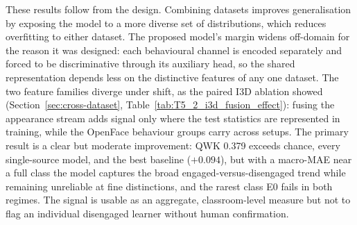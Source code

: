 \documentclass[../main.tex]{subfiles}
\begin{document}
These results follow from the design. Combining datasets improves generalisation by exposing the model to a more diverse set of distributions, which reduces overfitting to either dataset. The proposed model's margin widens off-domain for the reason it was designed: each behavioural channel is encoded separately and forced to be discriminative through its auxiliary head, so the shared representation depends less on the distinctive features of any one dataset. The two feature families diverge under shift, as the paired I3D ablation showed (Section~\ref{sec:cross-dataset}, Table~\ref{tab:T5_2_i3d_fusion_effect}): fusing the appearance stream adds signal only where the test statistics are represented in training, while the OpenFace behaviour groups carry across setups. The primary result is a clear but moderate improvement: QWK 0.379 exceeds chance, every single-source model, and the best baseline ($+0.094$), but with a macro-MAE near a full class the model captures the broad engaged-versus-disengaged trend while remaining unreliable at fine distinctions, and the rarest class E0 fails in both regimes. The signal is usable as an aggregate, classroom-level measure but not to flag an individual disengaged learner without human confirmation.
\end{document}
